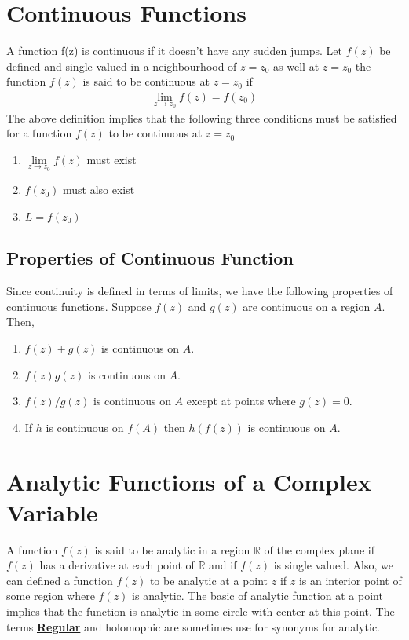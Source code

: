 \documentclass[11pt]{report}
\newcommand{\ubt}[1]{\textbf{\underline{#1}}}
\newcommand{\real}{ \mathbb{R}}
\begin{document}
	\section{Continuous Functions}
	A function f(z) is continuous if it doesn't have any sudden jumps. Let $f(z)$ be defined and single valued in a neighbourhood of $z=z_0$ as well at $z=z_0$ the function $f(z)$ is said to be continuous at $z=z_0$ if
	\begin{eqnarray}
		\lim\limits_{z\rightarrow z_0} f(z) = f(z_0)\label{eq:2_5}
	\end{eqnarray}
	The above definition implies that the following three conditions must be satisfied for a function $f(z)$ to be continuous at $z=z_0$
	\begin{enumerate}
		\item $\lim\limits_{z\rightarrow z_0} f(z)$ must exist
		\item $f(z_0)$ must also exist
		\item $L = f(z_0)$
	\end{enumerate}
	
	\subsection{Properties of Continuous Function}
	Since continuity is defined in terms of limits, we have the following properties of continuous functions. Suppose $f(z)$ and $g(z)$ are continuous on a region $A$. Then,
	\begin{enumerate}
		\item $f(z)+g(z)$ is continuous on $A$.
		\item $f(z)g(z)$ is continuous on $A$.
		\item $f(z)/g(z)$ is continuous on $A$ except at points where $g(z)=0$.
		\item If $h$ is continuous on $f(A)$ then $h(f(z))$ is continuous on $A$.
	\end{enumerate}

	\section{Analytic Functions of a Complex Variable}
	A function $f(z)$ is said to be analytic in a region $\real$ of the complex plane if $f(z)$ has a derivative at each point of $\real$ and if $f(z)$ is single valued. Also, we can defined a function $f(z)$ to be analytic at a point $z$ if $z$ is an interior point of some region where $f(z)$ is analytic. The basic of analytic function at a point implies that the function is analytic in some circle with center at this point. The terms \ubt{Regular} and holomophic are sometimes use for synonyms for analytic.\\
	
\end{document}
